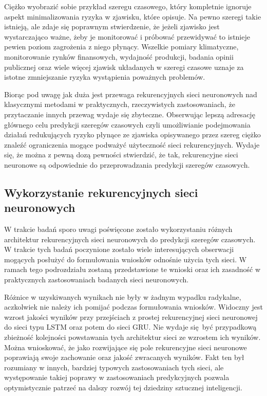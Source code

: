 \documentclass[10pt,a4paper]{article}
\begin{document}
Ciężko wyobrazić sobie przykład szeregu czasowego, który kompletnie ignoruje aspekt minimalizowania ryzyka w zjawisku, które opisuje. Na pewno szeregi takie istnieją, ale zdaje się poprawnym stwierdzenie, że jeżeli zjawisko jest wystarczająco ważne, żeby je monitorować i próbować przewidywać to istnieje pewien poziom zagrożenia z niego płynący. Wszelkie pomiary klimatyczne, monitorowanie rynków finansowych, wydajność produkcji, badania opinii publicznej oraz wiele więcej zjawisk układanych w szeregi czasowe uznaje za istotne zmniejszanie ryzyka wystąpienia poważnych problemów. 

Biorąc pod uwagę jak duża jest przewaga rekurencyjnych sieci neuronowych nad klasycznymi metodami w praktycznych, rzeczywistych zastosowaniach, że przytaczanie innych przewag wydaje się zbyteczne. Obserwując lepszą adresację głównego celu predykcji szeregów czasowych czyli umożliwianie podejmowania działań redukujących ryzyko płynące ze zjawiska opisywanego przez szereg ciężko znaleźć ograniczenia mogące podważyć użyteczność sieci rekurencyjnych. Wydaje się, że można z pewną dozą pewności stwierdzić, że tak, rekurencyjne sieci neuronowe są odpowiednie do przeprowadzania predykcji szeregów czasowych.

\subsection{Wykorzystanie rekurencyjnych sieci neuronowych}
W trakcie badań sporo uwagi poświęcone zostało wykorzystaniu różnych architektur rekurencyjnych sieci neuronowych do predykcji szeregów czasowych. W trakcie tych badań poczynione zostało wiele interesujących obserwacji mogących posłużyć do formułowania wniosków odnośnie użycia tych sieci. W ramach tego podrozdziału zostaną przedstawione te wnioski oraz ich zasadność w praktycznych zastosowaniach badanych sieci neuronowych. 

Różnice w uzyskiwanych wynikach nie były w żadnym wypadku radykalne, aczkolwiek nie należy ich pomijać podczas formułowania wniosków. Widoczny jest wzrost jakości wyników przy przejściach z prostej rekurencyjnej sieci neuronowej do sieci typu LSTM oraz potem do sieci GRU. Nie wydaje się być przypadkową zbieżność kolejności powstawania tych architektur sieci ze wzrostem ich wyników. Można wnioskować, że jako rozwijające się pole rekurencyjne sieci neuronowe poprawiają swoje zachowanie oraz jakość zwracanych wyników. Fakt ten był rozumiany w innych, bardziej typowych zastosowaniach tych sieci, ale występowanie takiej poprawy w zastosowaniach predykcyjnych pozwala optymistycznie patrzeć na dalszy rozwój tej dziedziny sztucznej inteligencji. 
\end{document}
